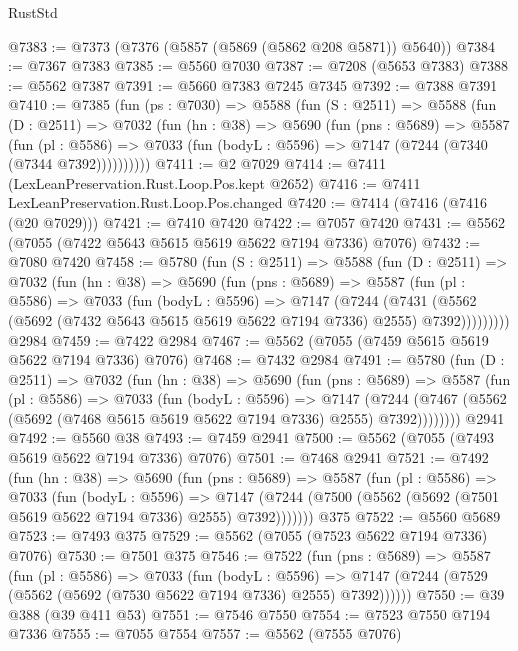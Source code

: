 \begin{lexlean}{RustStd}
\begin{coremodule}
@7383 := @7373 (@7376 (@5857 (@5869 (@5862 @208 @5871)) @5640))
@7384 := @7367 @7383
@7385 := @5560 @7030
@7387 := @7208 (@5653 @7383)
@7388 := @5562 @7387
@7391 := @5660 @7383 @7245 @7345
@7392 := @7388 @7391
@7410 := @7385
    (fun (ps : @7030) =>
    @5588
      (fun (S : @2511) =>
      @5588
        (fun (D : @2511) =>
        @7032
          (fun (hn : @38) =>
          @5690
            (fun (pns : @5689) =>
            @5587
              (fun (pl : @5586) =>
              @7033 (fun (bodyL : @5596) => @7147 (@7244 (@7340 (@7344 @7392))))))))))
@7411 := @2 @7029
@7414 := @7411 (LexLeanPreservation.Rust.Loop.Pos.kept @2652)
@7416 := @7411 LexLeanPreservation.Rust.Loop.Pos.changed
@7420 := @7414 (@7416 (@7416 (@20 @7029)))
@7421 := @7410 @7420
@7422 := @7057 @7420
@7431 := @5562 (@7055 (@7422 @5643 @5615 @5619 @5622 @7194 @7336) @7076)
@7432 := @7080 @7420
@7458 := @5780
    (fun (S : @2511) =>
    @5588
      (fun (D : @2511) =>
      @7032
        (fun (hn : @38) =>
        @5690
          (fun (pns : @5689) =>
          @5587
            (fun (pl : @5586) =>
            @7033
              (fun (bodyL : @5596) =>
              @7147
                (@7244
                  (@7431
                    (@5562 (@5692 (@7432 @5643 @5615 @5619 @5622 @7194 @7336) @2555) @7392)))))))))
    @2984
@7459 := @7422 @2984
@7467 := @5562 (@7055 (@7459 @5615 @5619 @5622 @7194 @7336) @7076)
@7468 := @7432 @2984
@7491 := @5780
    (fun (D : @2511) =>
    @7032
      (fun (hn : @38) =>
      @5690
        (fun (pns : @5689) =>
        @5587
          (fun (pl : @5586) =>
          @7033
            (fun (bodyL : @5596) =>
            @7147
              (@7244 (@7467 (@5562 (@5692 (@7468 @5615 @5619 @5622 @7194 @7336) @2555) @7392))))))))
    @2941
@7492 := @5560 @38
@7493 := @7459 @2941
@7500 := @5562 (@7055 (@7493 @5619 @5622 @7194 @7336) @7076)
@7501 := @7468 @2941
@7521 := @7492
    (fun (hn : @38) =>
    @5690
      (fun (pns : @5689) =>
      @5587
        (fun (pl : @5586) =>
        @7033
          (fun (bodyL : @5596) =>
          @7147 (@7244 (@7500 (@5562 (@5692 (@7501 @5619 @5622 @7194 @7336) @2555) @7392)))))))
    @375
@7522 := @5560 @5689
@7523 := @7493 @375
@7529 := @5562 (@7055 (@7523 @5622 @7194 @7336) @7076)
@7530 := @7501 @375
@7546 := @7522
    (fun (pns : @5689) =>
    @5587
      (fun (pl : @5586) =>
      @7033
        (fun (bodyL : @5596) =>
        @7147 (@7244 (@7529 (@5562 (@5692 (@7530 @5622 @7194 @7336) @2555) @7392))))))
@7550 := @39 @388 (@39 @411 @53)
@7551 := @7546 @7550
@7554 := @7523 @7550 @7194 @7336
@7555 := @7055 @7554
@7557 := @5562 (@7555 @7076)

\end{coremodule}
\end{lexlean}
